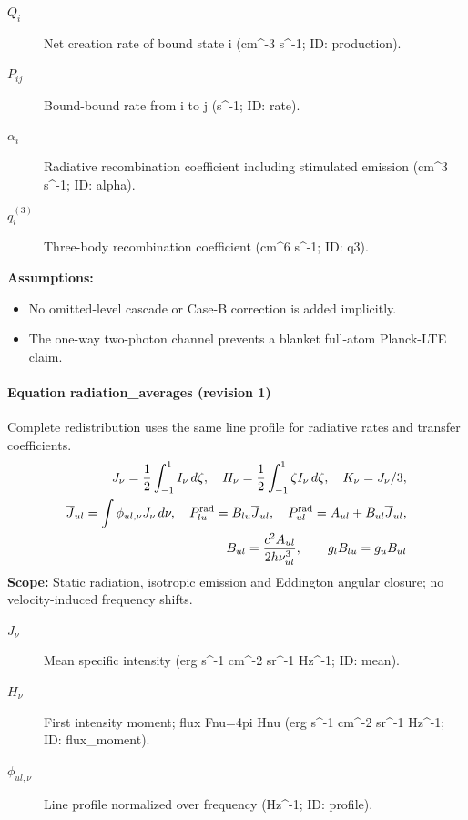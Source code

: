 \begin{description}
\item[$Q_i$] Net creation rate of bound state i (cm\textasciicircum{}-3 s\textasciicircum{}-1; ID: production).
\item[$P_{ij}$] Bound-bound rate from i to j (s\textasciicircum{}-1; ID: rate).
\item[$\alpha_i$] Radiative recombination coefficient including stimulated emission (cm\textasciicircum{}3 s\textasciicircum{}-1; ID: alpha).
\item[$q_i^{(3)}$] Three-body recombination coefficient (cm\textasciicircum{}6 s\textasciicircum{}-1; ID: q3).
\end{description}

\noindent\textbf{Assumptions:}
\begin{itemize}
\item No omitted-level cascade or Case-B correction is added implicitly.
\item The one-way two-photon channel prevents a blanket full-atom Planck-LTE claim.
\end{itemize}

\paragraph{Equation radiation\_averages (revision 1)}
Complete redistribution uses the same line profile for radiative rates and transfer coefficients.
\begin{equation}
\begin{aligned}
J_\nu=\frac12\int_{-1}^{1}I_\nu\,d\zeta,\quad H_\nu=\frac12\int_{-1}^{1}\zeta I_\nu\,d\zeta,\quad K_\nu=J_\nu/3,\\\overline J_{ul}=\int\phi_{ul,\nu}J_\nu\,d\nu,\quad P_{lu}^{\rm rad}=B_{lu}\overline J_{ul},\quad P_{ul}^{\rm rad}=A_{ul}+B_{ul}\overline J_{ul},\\B_{ul}=\frac{c^2A_{ul}}{2h\nu_{ul}^3},\qquad g_lB_{lu}=g_uB_{ul}
\end{aligned}
\label{eq:escape.coupled_5f_hydrogen:radiation_5f_averages:1}
\end{equation}
\noindent\textbf{Scope:} Static radiation, isotropic emission and Eddington angular closure; no velocity-induced frequency shifts.

\begin{description}
\item[$J_\nu$] Mean specific intensity (erg s\textasciicircum{}-1 cm\textasciicircum{}-2 sr\textasciicircum{}-1 Hz\textasciicircum{}-1; ID: mean).
\item[$H_\nu$] First intensity moment; flux Fnu=4pi Hnu (erg s\textasciicircum{}-1 cm\textasciicircum{}-2 sr\textasciicircum{}-1 Hz\textasciicircum{}-1; ID: flux\_moment).
\item[$\phi_{ul,\nu}$] Line profile normalized over frequency (Hz\textasciicircum{}-1; ID: profile).
\end{description}

